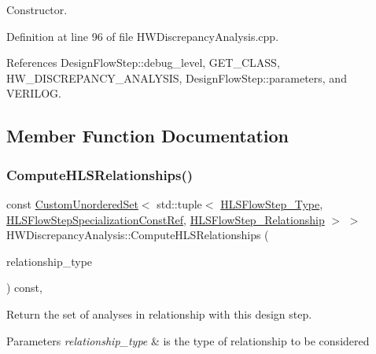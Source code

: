 Constructor. 



Definition at line 96 of file H\+W\+Discrepancy\+Analysis.\+cpp.



References Design\+Flow\+Step\+::debug\+\_\+level, G\+E\+T\+\_\+\+C\+L\+A\+SS, H\+W\+\_\+\+D\+I\+S\+C\+R\+E\+P\+A\+N\+C\+Y\+\_\+\+A\+N\+A\+L\+Y\+S\+IS, Design\+Flow\+Step\+::parameters, and V\+E\+R\+I\+L\+OG.



\subsection{Member Function Documentation}
\mbox{\label{classHWDiscrepancyAnalysis_a5500a8e705ce27d9c0f39e3f8474714f}} 
\subsubsection{\texorpdfstring{Compute\+H\+L\+S\+Relationships()}{ComputeHLSRelationships()}}
{\footnotesize\ttfamily const \hyperlink{classCustomUnorderedSet}{Custom\+Unordered\+Set}$<$ std\+::tuple$<$ \hyperlink{hls__step_8hpp_ada16bc22905016180e26fc7e39537f8d}{H\+L\+S\+Flow\+Step\+\_\+\+Type}, \hyperlink{hls__step_8hpp_a5fdd2edf290c196531d21d68e13f0e74}{H\+L\+S\+Flow\+Step\+Specialization\+Const\+Ref}, \hyperlink{hls__step_8hpp_a3ad360b9b11e6bf0683d5562a0ceb169}{H\+L\+S\+Flow\+Step\+\_\+\+Relationship} $>$ $>$ H\+W\+Discrepancy\+Analysis\+::\+Compute\+H\+L\+S\+Relationships (\begin{DoxyParamCaption}\item[{const \hyperlink{classDesignFlowStep_a723a3baf19ff2ceb77bc13e099d0b1b7}{Design\+Flow\+Step\+::\+Relationship\+Type}}]{relationship\+\_\+type }\end{DoxyParamCaption}) const\hspace{0.3cm}{\ttfamily [protected]}, {\ttfamily [virtual]}}



Return the set of analyses in relationship with this design step. 


\begin{DoxyParams}{Parameters}
{\em relationship\+\_\+type} & is the type of relationship to be considered \\
\hline
\end{DoxyParams}


